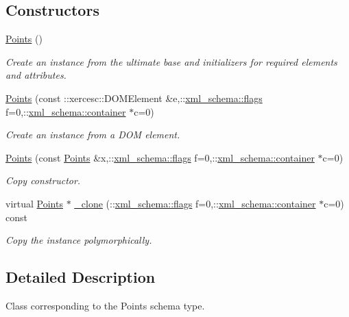 \subsection*{Constructors}
\begin{DoxyCompactItemize}
\item 
\hyperlink{classPoints_aa4e68083d98bd04233c9753dfe1e46ab}{Points} ()
\begin{DoxyCompactList}\small\item\em Create an instance from the ultimate base and initializers for required elements and attributes. \end{DoxyCompactList}\item 
\hyperlink{classPoints_a36a1ac8ea9ac092adff2888915e81304}{Points} (const \+::xercesc\+::\+D\+O\+M\+Element \&e,\+::\hyperlink{namespacexml__schema_a8d981c127a1f5106d04ad5853e707361}{xml\+\_\+schema\+::flags} f=0,\+::\hyperlink{namespacexml__schema_a395f5179c5fc4643909d66e9ff28d8ca}{xml\+\_\+schema\+::container} $\ast$c=0)
\begin{DoxyCompactList}\small\item\em Create an instance from a D\+O\+M element. \end{DoxyCompactList}\item 
\hyperlink{classPoints_ad49b51469dc53b028c244a88bd9fb08b}{Points} (const \hyperlink{classPoints}{Points} \&x,\+::\hyperlink{namespacexml__schema_a8d981c127a1f5106d04ad5853e707361}{xml\+\_\+schema\+::flags} f=0,\+::\hyperlink{namespacexml__schema_a395f5179c5fc4643909d66e9ff28d8ca}{xml\+\_\+schema\+::container} $\ast$c=0)
\begin{DoxyCompactList}\small\item\em Copy constructor. \end{DoxyCompactList}\item 
virtual \hyperlink{classPoints}{Points} $\ast$ \hyperlink{classPoints_a5dff673c4b4a59465aee3ede80328ae9}{\+\_\+clone} (\+::\hyperlink{namespacexml__schema_a8d981c127a1f5106d04ad5853e707361}{xml\+\_\+schema\+::flags} f=0,\+::\hyperlink{namespacexml__schema_a395f5179c5fc4643909d66e9ff28d8ca}{xml\+\_\+schema\+::container} $\ast$c=0) const 
\begin{DoxyCompactList}\small\item\em Copy the instance polymorphically. \end{DoxyCompactList}\end{DoxyCompactItemize}


\subsection{Detailed Description}
Class corresponding to the Points schema type. 


